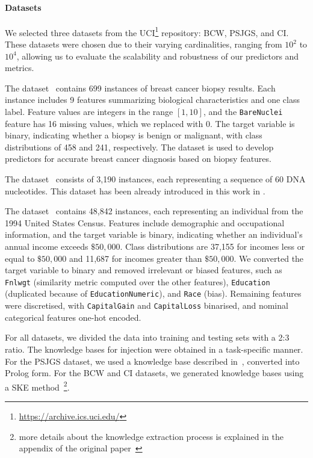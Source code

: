 \paragraph{Datasets}
%
We selected three datasets from the UCI\footnote{\url{https://archive.ics.uci.edu/}} repository: \gls{BCW}, \gls{PSJGS}, and \gls{CI}.
%
These datasets were chosen due to their varying cardinalities, ranging from \(10^2\) to \(10^4\), allowing us to evaluate the scalability and robustness of our predictors and metrics.

%
The \textbf{} dataset~\cite{breast_cancer_wisconsin_original_15} contains 699 instances of breast cancer biopsy results.
%
Each instance includes 9 features summarizing biological characteristics and one class label.
%
Feature values are integers in the range \([1, 10]\), and the \texttt{BareNuclei} feature has 16 missing values, which we replaced with 0.
%
The target variable is binary, indicating whether a biopsy is benign or malignant, with class distributions of 458 and 241, respectively.
%
The dataset is used to develop predictors for accurate breast cancer diagnosis based on biopsy features.

%
The \textbf{} dataset~\cite{splice-junction_gene_sequences_69} consists of 3,190 instances, each representing a sequence of 60 DNA nucleotides.
%
This dataset has been already introduced in this work in .

%
The \textbf{} dataset~\cite{census_income_20} contains 48,842 instances, each representing an individual from the 1994 United States Census.
%
Features include demographic and occupational information, and the target variable is binary, indicating whether an individual's annual income exceeds \(\$50,000\).
%
Class distributions are 37,155 for incomes less or equal to \(\$50,000\) and 11,687 for incomes greater than \(\$50,000\).
%
We converted the target variable to binary and removed irrelevant or biased features, such as \texttt{Fnlwgt} (similarity metric computed over the other features), \texttt{Education} (duplicated because of \texttt{EducationNumeric}), and \texttt{Race} (bias).
%
Remaining features were discretised, with \texttt{CapitalGain} and \texttt{CapitalLoss} binarised, and nominal categorical features one-hot encoded.

%
For all datasets, we divided the data into training and testing sets with a 2:3 ratio.
%
The knowledge bases for injection were obtained in a task-specific manner.
%
For the \gls{PSJGS} dataset, we used a knowledge base described in~\cite{DBLP:conf/aaai/TowellSN90}, converted into Prolog form.
%
For the \gls{BCW} and \gls{CI} datasets, we generated knowledge bases using a \gls{SKE} method~\cite{psyke-ia16}\footnote{more details about the knowledge extraction process is explained in the appendix of the original paper~\cite{DBLP:journals/aamas/AgiolloRMCO23}}.



